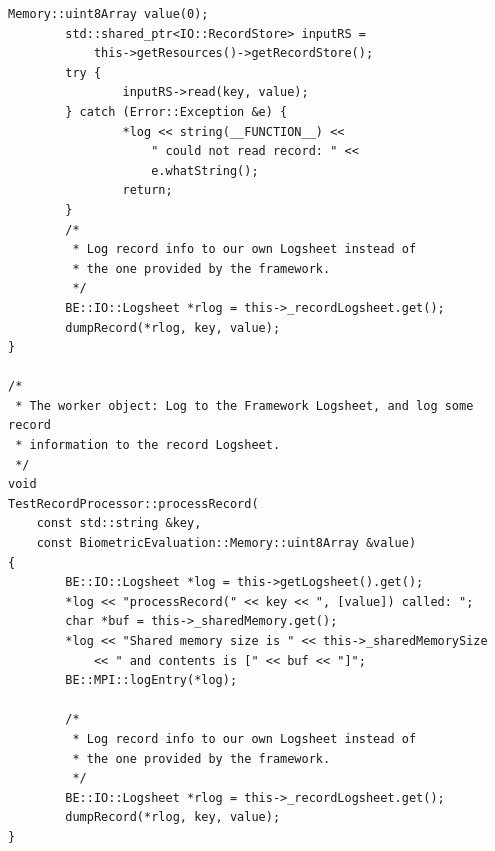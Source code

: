 \begin{lstlisting}[caption={MPI Framework Application Implementation}, label=lst:mpiappimpl]
        Memory::uint8Array value(0);
        std::shared_ptr<IO::RecordStore> inputRS =
            this->getResources()->getRecordStore();
        try {
                inputRS->read(key, value);
        } catch (Error::Exception &e) {
                *log << string(__FUNCTION__) <<
                    " could not read record: " <<
                    e.whatString();
                return; 
        }
        /*
         * Log record info to our own Logsheet instead of
         * the one provided by the framework.
         */     
        BE::IO::Logsheet *rlog = this->_recordLogsheet.get();
        dumpRecord(*rlog, key, value);
}

/*
 * The worker object: Log to the Framework Logsheet, and log some record
 * information to the record Logsheet.
 */
void
TestRecordProcessor::processRecord(
    const std::string &key,
    const BiometricEvaluation::Memory::uint8Array &value)
{
        BE::IO::Logsheet *log = this->getLogsheet().get();
        *log << "processRecord(" << key << ", [value]) called: ";
        char *buf = this->_sharedMemory.get();
        *log << "Shared memory size is " << this->_sharedMemorySize
            << " and contents is [" << buf << "]";
        BE::MPI::logEntry(*log);

        /*
         * Log record info to our own Logsheet instead of
         * the one provided by the framework.
         */
        BE::IO::Logsheet *rlog = this->_recordLogsheet.get();
        dumpRecord(*rlog, key, value);
}

\end{lstlisting}

